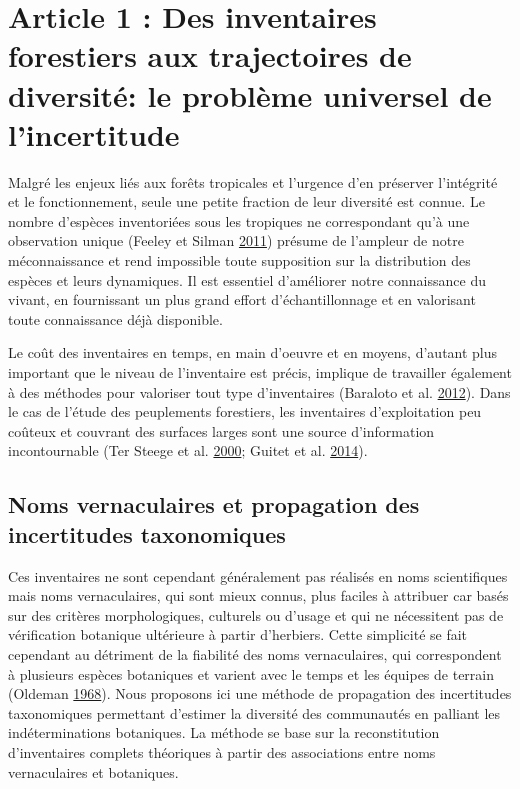 \documentclass[11pt,french,A4paper,extrafontsizes,onecolumn,openright]{memoir}
\begin{document}
\chapter{Article 1 : Des inventaires forestiers aux trajectoires de
diversité: le problème universel de
l'incertitude}\label{article-1-des-inventaires-forestiers-aux-trajectoires-de-diversite-le-probleme-universel-de-lincertitude}

Malgré les enjeux liés aux forêts tropicales et l'urgence d'en préserver
l'intégrité et le fonctionnement, seule une petite fraction de leur
diversité est connue. Le nombre d'espèces inventoriées sous les
tropiques ne correspondant qu'à une observation unique (Feeley et Silman
\protect\hyperlink{ref-Feeley2011}{2011}) présume de l'ampleur de notre
méconnaissance et rend impossible toute supposition sur la distribution
des espèces et leurs dynamiques. Il est essentiel d'améliorer notre
connaissance du vivant, en fournissant un plus grand effort
d'échantillonnage et en valorisant toute connaissance déjà disponible.

Le coût des inventaires en temps, en main d'oeuvre et en moyens,
d'autant plus important que le niveau de l'inventaire est précis,
implique de travailler également à des méthodes pour valoriser tout type
d'inventaires (Baraloto et al.
\protect\hyperlink{ref-Baraloto2012}{2012}). Dans le cas de l'étude des
peuplements forestiers, les inventaires d'exploitation peu coûteux et
couvrant des surfaces larges sont une source d'information
incontournable (Ter Steege et al.
\protect\hyperlink{ref-terSteege2000}{2000}; Guitet et al.
\protect\hyperlink{ref-Guitet2014}{2014}).

\section{Noms vernaculaires et propagation des incertitudes
taxonomiques}\label{noms-vernaculaires-et-propagation-des-incertitudes-taxonomiques}

Ces inventaires ne sont cependant généralement pas réalisés en noms
scientifiques mais noms vernaculaires, qui sont mieux connus, plus
faciles à attribuer car basés sur des critères morphologiques, culturels
ou d'usage et qui ne nécessitent pas de vérification botanique
ultérieure à partir d'herbiers. Cette simplicité se fait cependant au
détriment de la fiabilité des noms vernaculaires, qui correspondent à
plusieurs espèces botaniques et varient avec le temps et les équipes de
terrain (Oldeman \protect\hyperlink{ref-Oldeman1968}{1968}). Nous
proposons ici une méthode de propagation des incertitudes taxonomiques
permettant d'estimer la diversité des communautés en palliant les
indéterminations botaniques. La méthode se base sur la reconstitution
d'inventaires complets théoriques à partir des associations entre noms
vernaculaires et botaniques.
\end{document}
